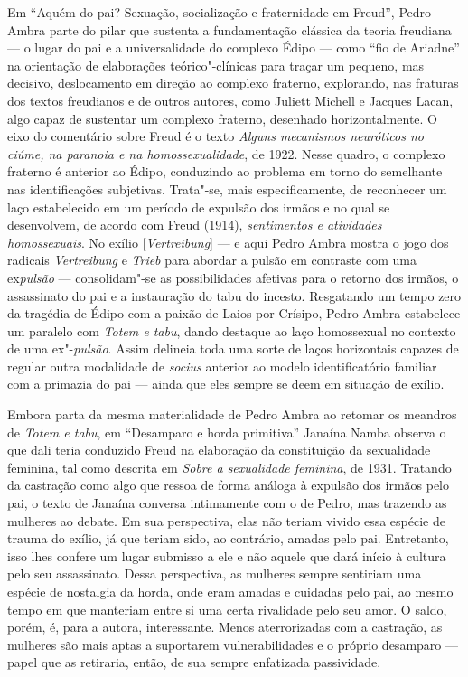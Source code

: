 Em ``Aquém do pai? Sexuação, socialização e fraternidade em Freud'',
Pedro Ambra parte do pilar que sustenta a fundamentação clássica da
teoria freudiana --- o lugar do pai e a universalidade do complexo Édipo
--- como ``fio de Ariadne'' na orientação de elaborações teórico"-clínicas
para traçar um pequeno, mas decisivo, deslocamento em direção ao
complexo fraterno, explorando, nas fraturas dos textos freudianos e de
outros autores, como Juliett Michell e Jacques Lacan, algo capaz de
sustentar um complexo fraterno, desenhado horizontalmente. O eixo do
comentário sobre Freud é o texto \emph{Alguns mecanismos neuróticos no
ciúme, na paranoia e na homossexualidade}, de 1922. Nesse quadro, o
complexo fraterno é anterior ao Édipo, conduzindo ao problema em torno
do semelhante nas identificações subjetivas. Trata"-se, mais
especificamente, de reconhecer um laço estabelecido em um período de
expulsão dos irmãos e no qual se desenvolvem, de acordo com Freud
(1914), \emph{sentimentos e atividades homossexuais}. No exílio
{[}\emph{Vertreibung}{]} --- e aqui Pedro Ambra mostra o jogo dos
radicais \emph{Vertreibung} e \emph{Trieb} para abordar a pulsão em
contraste com uma ex\emph{pulsão} --- consolidam"-se as possibilidades
afetivas para o retorno dos irmãos, o assassinato do pai e a instauração
do tabu do incesto. Resgatando um tempo zero da tragédia de Édipo com a
paixão de Laios por Crísipo, Pedro Ambra estabelece um paralelo com
\emph{Totem e tabu}, dando destaque ao laço homossexual no contexto de uma
ex"-\emph{pulsão}. Assim delineia toda uma sorte de laços horizontais
capazes de regular outra modalidade de \emph{socius} anterior ao modelo
identificatório familiar com a primazia do pai --- ainda que eles sempre
se deem em situação de exílio.

Embora parta da mesma materialidade de Pedro Ambra ao retomar os
meandros de \emph{Totem e tabu}, em ``Desamparo e horda primitiva''
Janaína Namba observa o que dali teria conduzido Freud na elaboração da
constituição da sexualidade feminina, tal como descrita em \emph{Sobre a
sexualidade feminina}, de 1931. Tratando da castração como algo que
ressoa de forma análoga à expulsão dos irmãos pelo pai, o texto de
Janaína conversa intimamente com o de Pedro, mas trazendo as
mulheres ao debate. Em sua perspectiva, elas não teriam vivido essa
espécie de trauma do exílio, já que teriam sido, ao contrário, amadas
pelo pai. Entretanto, isso lhes confere um lugar submisso a ele e não
aquele que dará início à cultura pelo seu assassinato. Dessa
perspectiva, as mulheres sempre sentiriam uma espécie de nostalgia da
horda, onde eram amadas e cuidadas pelo pai, ao mesmo tempo em que
manteriam entre si uma certa rivalidade pelo seu amor. O saldo, porém,
é, para a autora, interessante. Menos aterrorizadas com a castração, as
mulheres são mais aptas a suportarem vulnerabilidades e o próprio
desamparo --- papel que as retiraria, então, de sua sempre enfatizada
passividade.

